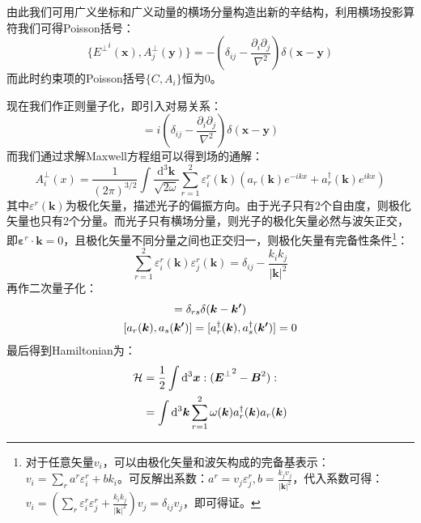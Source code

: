 由此我们可用广义坐标和广义动量的横场分量构造出新的辛结构，利用横场投影算符我们可得Poisson括号：
\begin{equation}
\{{E^{\bot}}^i(\boldsymbol{x}),A^{\bot}_j(\boldsymbol{y})\}=-\left(\delta_{ij}-\frac{\partial_i\partial_j}{\nabla^2}\right)\delta(\boldsymbol{x}-\boldsymbol{y})
\end{equation}
而此时约束项的Poisson括号$\{C,A_i\}$恒为0。
\par 现在我们作正则量子化，即引入对易关系：
\begin{equation}
[{E^{\bot}}^i(\boldsymbol{x}),A^{\bot}_j(\boldsymbol{y})]=i\left(\delta_{ij}-\frac{\partial_i\partial_j}{\nabla^2}\right)\delta(\boldsymbol{x}-\boldsymbol{y})
\end{equation}
而我们通过求解Maxwell方程组可以得到场的通解：
\begin{equation}
A_i^{\bot}(x)=\frac{1}{(2\pi)^{3/2}}\int\frac{\mathrm{d}^3\boldsymbol{k}}{\sqrt{2\omega}}\sum_{r=1}^{2}\varepsilon_i^r(\boldsymbol{k})\left(a_r(\boldsymbol{k})e^{-ikx}+a^{\dagger}_r(\boldsymbol{k})e^{ikx}\right)
\end{equation}
其中$\varepsilon^r(\boldsymbol{k})$为极化矢量，描述光子的偏振方向。由于光子只有2个自由度，则极化矢量也只有2个分量。而光子只有横场分量，则光子的极化矢量必然与波矢正交，即$\boldsymbol{\varepsilon}^r\cdot\boldsymbol{k}=0$，且极化矢量不同分量之间也正交归一，则极化矢量有完备性条件\footnote{
	对于任意矢量$v_i$，可以由极化矢量和波矢构成的完备基表示：$v_i=\sum_r a^r\varepsilon^r_i+bk_i$。可反解出系数：$a^r=v_j\varepsilon_j^r,b=\frac{k_j v_j}{|\boldsymbol{k}|^2}$，代入系数可得：$v_i=\left(\sum_r\varepsilon^r_i\varepsilon^r_j+\frac{k_ik_j}{|\boldsymbol{k}|^2}\right)v_j=\delta_{ij}v_j$，即可得证。
}：
\begin{equation}
\sum_{r=1}^{2}\varepsilon^r_i(\boldsymbol{k})\varepsilon^r_j(\boldsymbol{k})=\delta_{ij}-\frac{k_ik_j}{|\boldsymbol{k}|^2}
\end{equation}
再作二次量子化：
\begin{gather}
[a_r(\boldsymbol{k}),a^{\dagger}_s(\boldsymbol{k'})]=\delta_{rs}\delta(\boldsymbol{k}-\boldsymbol{k'})\notag\\
[a_r(\boldsymbol{k}),a_s(\boldsymbol{k'})]=[a^{\dagger}_r(\boldsymbol{k}),a^{\dagger}_s(\boldsymbol{k'})]=0
\end{gather}
最后得到Hamiltonian为：
\begin{align}
\mathcal{H}&=\frac{1}{2}\int\mathrm{d}^3\boldsymbol{x}:({\boldsymbol{E}^{\bot}}^2-{\boldsymbol{B}}^2):\notag\\
&=\int\mathrm{d}^3\boldsymbol{k}\sum_{r=1}^{2}\omega(\boldsymbol{k})a^{\dagger}_r(\boldsymbol{k})a_r(\boldsymbol{k})
\end{align}
